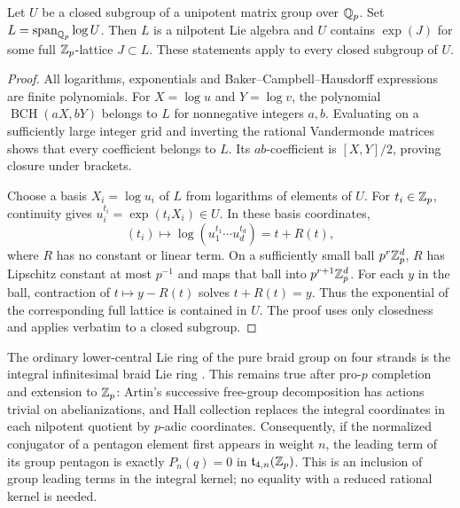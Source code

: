 \begin{lemma}
\label{lem:compact-log}
Let $U$ be a closed subgroup of a unipotent matrix group over $\mathbb Q_p$.
Set $L=\operatorname{span}_{\mathbb Q_p}\log U$.  Then $L$ is a nilpotent Lie
algebra and $U$ contains $\exp(J)$ for some full $\mathbb Z_p$-lattice
$J\subset L$.  These statements apply to every closed subgroup of $U$.
\end{lemma}
\begin{proof}
All logarithms, exponentials and Baker--Campbell--Hausdorff expressions
are finite polynomials.  For $X=\log u$ and $Y=\log v$, the polynomial
$\operatorname{BCH}(aX,bY)$ belongs to $L$ for nonnegative integers
$a,b$.  Evaluating on a sufficiently large integer grid and inverting
the rational Vandermonde matrices shows that every coefficient belongs
to $L$.  Its $ab$-coefficient is $[X,Y]/2$, proving closure under brackets.

Choose a basis $X_i=\log u_i$ of $L$ from logarithms of elements of $U$.
For $t_i\in\mathbb Z_p$, continuity gives $u_i^{t_i}=\exp(t_iX_i)\in U$.
In these basis coordinates,
\[
 (t_i)\longmapsto\log(u_1^{t_1}\cdots u_d^{t_d})=t+R(t),
\]
where $R$ has no constant or linear term.  On a sufficiently small ball
$p^r\mathbb Z_p^d$, $R$ has Lipschitz constant at most $p^{-1}$ and maps that
ball into $p^{r+1}\mathbb Z_p^d$.  For each $y$ in the ball, contraction of
$t\mapsto y-R(t)$ solves $t+R(t)=y$.  Thus the exponential of the
corresponding full lattice is contained in $U$.  The proof uses only
closedness and applies verbatim to a closed subgroup.
\end{proof}

The ordinary lower-central Lie ring of the pure braid group on four
strands is the integral infinitesimal braid Lie ring
\cite[\S4, p.~223]{CohenFalkRandell}.  This remains true after
pro-$p$ completion and extension to $\mathbb Z_p$: Artin's successive free-group
decomposition has actions trivial on abelianizations, and Hall collection
replaces the integral coordinates in each nilpotent quotient by
$p$-adic coordinates.  Consequently, if the normalized conjugator of
a pentagon element first appears in weight $n$, the leading term of
its group pentagon is exactly $P_n(q)=0$ in
$\mathfrak t_{4,n}(\mathbb Z_p)$.  This is an inclusion of group leading terms
in the integral kernel; no equality with a reduced rational kernel is
needed.

